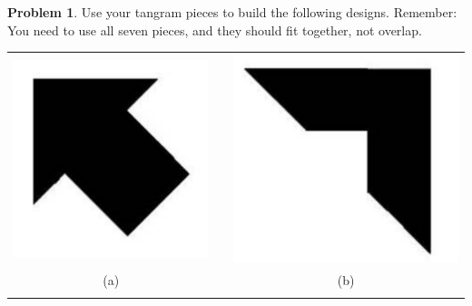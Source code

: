 \documentclass[12pt, reqno]{amsart}
\theoremstyle{remark}
\theoremstyle{definition}
\newtheorem{problem}{Problem}
\numberwithin{equation}{section}  %
\begin{document}
\begin{problem}
Use your tangram pieces to build the following designs.  Remember: You need to use all seven pieces, and they should fit together, not overlap.


\begin{center}
\begin{tabular}{ccc}
\includegraphics[scale=0.4]{tangram1} & 
\qquad \qquad\qquad& 
\includegraphics[scale=0.4]{tangram2}\\
(a) && (b)\\
\\

\end{tabular}
\end{center}
\end{problem}
\end{document}
